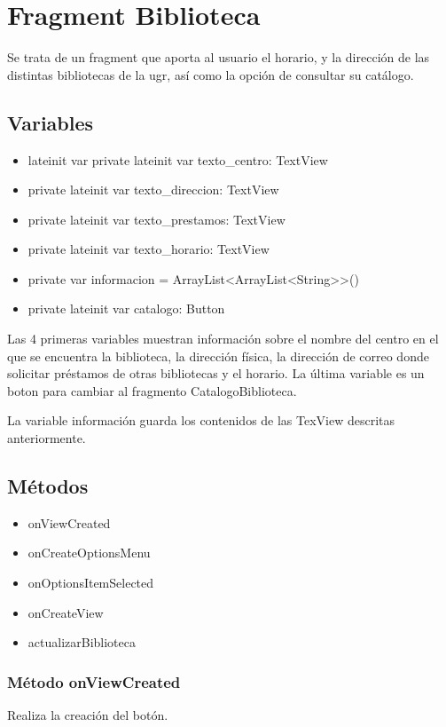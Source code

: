 \section{Fragment Biblioteca}
Se trata de un fragment que aporta al usuario el horario, y la dirección de las distintas bibliotecas de la ugr, así como la opción  de consultar su catálogo.

\subsection{Variables}

\begin{itemize}

\item{lateinit var private lateinit var texto_centro: TextView}
\item{private lateinit var texto_direccion: TextView}
\item{private lateinit var texto_prestamos: TextView}
\item{private lateinit var texto_horario: TextView}
\item{private var informacion = ArrayList<ArrayList<String>>()}
\item{private lateinit var catalogo: Button}

\end{itemize}

Las 4 primeras variables muestran información sobre el nombre del centro en el que se encuentra la biblioteca, la dirección física, la dirección de correo donde solicitar préstamos de otras bibliotecas y el horario. La última variable es un boton para cambiar al fragmento CatalogoBiblioteca.

La variable información guarda los contenidos de las TexView descritas anteriormente.

\subsection{Métodos}

\begin{itemize}
\item{onViewCreated}
\item{onCreateOptionsMenu}
\item{onOptionsItemSelected}
\item{onCreateView}
\item{actualizarBiblioteca}
\end{itemize}

\subsubsection{Método onViewCreated}
Realiza la creación del botón.

